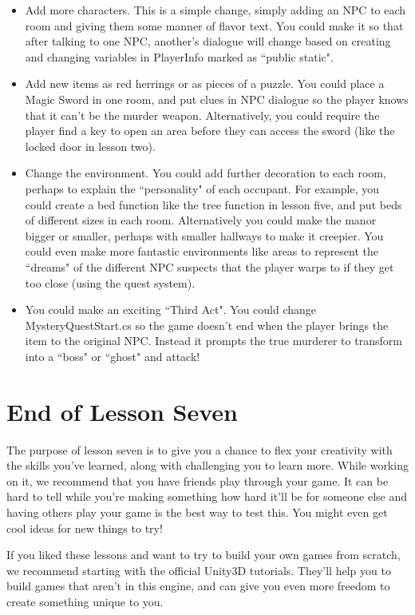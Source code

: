\documentclass{article}
\begin{document}
\begin{itemize}
\item Add more characters. This is a simple change, simply adding an NPC to each room and giving them some manner of flavor text. You could make it so that after talking to one NPC, another's dialogue will change based on creating and changing variables in PlayerInfo marked as ``public static". 
\item Add new items as red herrings or as pieces of a puzzle. You could place a Magic Sword in one room, and put clues in NPC dialogue so the player knows that it can't be the murder weapon. Alternatively, you could require the player find a key to open an area before they can access the sword (like the locked door in lesson two).
\item Change the environment. You could add further decoration to each room, perhaps to explain the ``personality" of each occupant. For example, you could create a bed function like the tree function in lesson five, and put beds of different sizes in each room. Alternatively you could make the manor bigger or smaller, perhaps with smaller hallways to make it creepier. You could even make more fantastic environments like areas to represent the ``dreams" of the different NPC suspects that the player warps to if they get too close (using the quest system).
\item You could make an exciting ``Third Act". You could change MysteryQuestStart.cs so the game doesn't end when the player brings the item to the original NPC. Instead it prompts the true murderer to transform into a ``boss" or ``ghost" and attack! 
\end{itemize}

\section{End of Lesson Seven}

The purpose of lesson seven is to give you a chance to flex your creativity with the skills you've learned, along with challenging you to learn more. While working on it, we recommend that you have friends play through your game. It can be hard to tell while you're making something how hard it'll be for someone else and having others play your game is the best way to test this. You might even get cool ideas for new things to try! 

If you liked these lessons and want to try to build your own games from scratch, we recommend starting with the official Unity3D tutorials. They'll help you to build games that aren't in this engine, and can give you even more freedom to create something unique to you.
\end{document}
